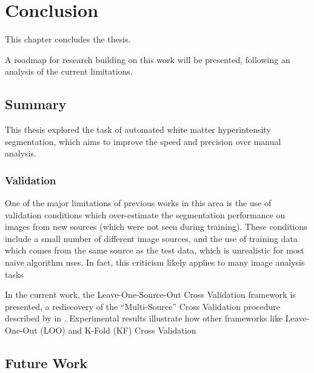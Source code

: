 \chapter{Conclusion}\label{ch-conc}
This chapter concludes the thesis.

A roadmap for research building on this work will be presented,
following an analysis of the current limitations.
\section{Summary}
This thesis explored the task of automated white matter hyperintensity segmentation,
which aims to improve the speed and precision over manual analysis.
\subsection{Validation}
One of the major limitations of previous works in this area
is the use of validation conditions which over-estimate
the segmentation performance on images from new sources
(which were not seen during training).
These conditions include a small number of different image sources,
and the use of training data which comes from the same source as the test data,
which is unrealistic for most naive algorithm uses.
In fact, this criticism likely applies to many image analysis tasks
\par
In the current work, the Leave-One-Source-Out Cross Validation framework is presented,
a rediscovery of the ``Multi-Source'' Cross Validation procedure
described by \citeauthor{Geras2013} in \cite{Geras2013}.
Experimental results illustrate how other frameworks like
Leave-One-Out (LOO) and K-Fold (KF) Cross Validation

\section{Future Work}



